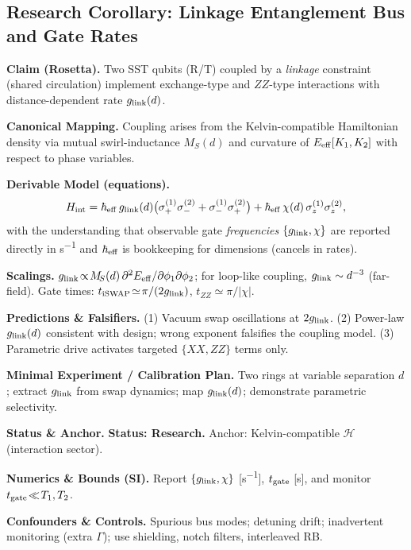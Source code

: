 \documentclass[10pt,reprint,aps,onecolumn,nofootinbib]{revtex4-2}
\begin{document}
    \subsection*{Research Corollary: Linkage Entanglement Bus and Gate Rates}

        \textbf{Claim (Rosetta).}
        Two SST qubits (R/T) coupled by a \emph{linkage} constraint (shared circulation) implement exchange-type and $ZZ$-type interactions with distance-dependent rate $g_{\rm link}(d)$.

        \textbf{Canonical Mapping.}
        Coupling arises from the Kelvin-compatible Hamiltonian density via mutual swirl-inductance $M_{\!S}(d)$ and curvature of $E_{\rm eff}[K_1,K_2]$ with respect to phase variables.

        \textbf{Derivable Model (equations).}
        \[
            H_{\rm int} = \hbar_{\rm eff}\, g_{\rm link}(d)\big(\sigma_+^{(1)}\sigma_-^{(2)}+\sigma_-^{(1)}\sigma_+^{(2)}\big)
            + \hbar_{\rm eff}\,\chi(d)\,\sigma_z^{(1)}\sigma_z^{(2)} ,
        \]
        with the understanding that observable gate \emph{frequencies} $\{g_{\rm link},\chi\}$ are reported directly in \si{s^{-1}} and $\hbar_{\rm eff}$ is bookkeeping for dimensions (cancels in rates).

        \textbf{Scalings.}
        $g_{\rm link}\!\propto\! M_{\!S}(d)\,\partial^2 E_{\rm eff}/\partial\phi_1 \partial\phi_2$; for loop-like coupling, $g_{\rm link}\sim d^{-3}$ (far-field). Gate times: $t_{\rm iSWAP}\!\simeq\!\pi/(2 g_{\rm link})$, $t_{ZZ}\!\simeq\!\pi/|\chi|$.

        \textbf{Predictions \& Falsifiers.}
        (1) Vacuum swap oscillations at $2g_{\rm link}$. (2) Power-law $g_{\rm link}(d)$ consistent with design; wrong exponent falsifies the coupling model. (3) Parametric drive activates targeted $\{XX,ZZ\}$ terms only.

        \textbf{Minimal Experiment / Calibration Plan.}
        Two rings at variable separation $d$; extract $g_{\rm link}$ from swap dynamics; map $g_{\rm link}(d)$; demonstrate parametric selectivity.

        \textbf{Status \& Anchor.}
        \textbf{Status: Research.} Anchor: Kelvin-compatible $\mathcal H$ (interaction sector).

        \textbf{Numerics \& Bounds (SI).}
        Report $\{g_{\rm link},\chi\}$ [\si{s^{-1}}], $t_{\rm gate}$ [\si{s}], and monitor $t_{\rm gate}\!\ll\! T_1,T_2$.

        \textbf{Confounders \& Controls.}
        Spurious bus modes; detuning drift; inadvertent monitoring (extra $\Gamma$); use shielding, notch filters, interleaved RB.
\end{document}
